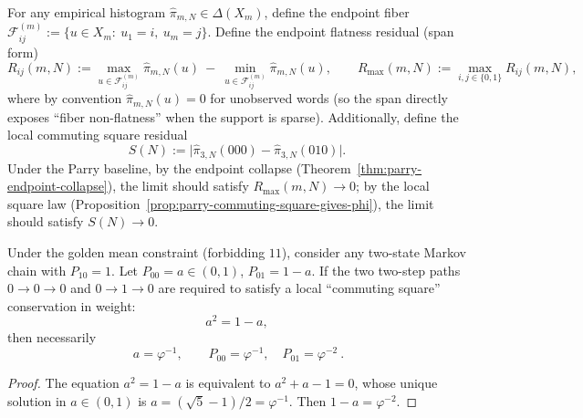 \begin{definition}\label{def:endpoint-flatness-square-residue}
For any empirical histogram \(\hat\pi_{m,N}\in\Delta(X_m)\), define the endpoint fiber
\(
\mathcal{F}_{ij}^{(m)}:=\{u\in X_m:\ u_1=i,\ u_m=j\}
\).
Define the endpoint flatness residual (span form)
\[
R_{ij}(m,N):=\max_{u\in \mathcal{F}_{ij}^{(m)}}\hat\pi_{m,N}(u)\ -\ \min_{u\in \mathcal{F}_{ij}^{(m)}}\hat\pi_{m,N}(u),
\qquad
R_{\max}(m,N):=\max_{i,j\in\{0,1\}}R_{ij}(m,N),
\]
where by convention \(\hat\pi_{m,N}(u)=0\) for unobserved words (so the span directly exposes ``fiber non-flatness'' when the support is sparse).
Additionally, define the local commuting square residual
\[
S(N):=\bigl|\hat\pi_{3,N}(000)-\hat\pi_{3,N}(010)\bigr|.
\]
Under the Parry baseline, by the endpoint collapse (Theorem~\ref{thm:parry-endpoint-collapse}), the limit should satisfy \(R_{\max}(m,N)\to 0\);
by the local square law (Proposition~\ref{prop:parry-commuting-square-gives-phi}), the limit should satisfy \(S(N)\to 0\).
\end{definition}

\begin{proposition}[Local commuting square \texorpdfstring{$\Rightarrow$}{=>} golden transition probability]\label{prop:parry-commuting-square-gives-phi}
Under the golden mean constraint (forbidding \(11\)), consider any two-state Markov chain with \(P_{10}=1\).
Let \(P_{00}=a\in(0,1)\), \(P_{01}=1-a\).
If the two two-step paths \(0\to0\to0\) and \(0\to1\to0\) are required to satisfy a local ``commuting square'' conservation in weight:
\[
a^2=1-a,
\]
then necessarily
\[
\boxed{\ a=\varphi^{-1},\qquad P_{00}=\varphi^{-1},\quad P_{01}=\varphi^{-2}\ }.
\]
\end{proposition}
\begin{proof}
The equation \(a^2=1-a\) is equivalent to \(a^2+a-1=0\), whose unique solution in \(a\in(0,1)\) is \(a=(\sqrt5-1)/2=\varphi^{-1}\).
Then \(1-a=\varphi^{-2}\).
\end{proof}

